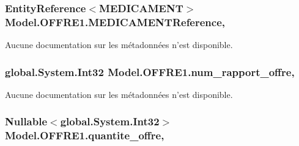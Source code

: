 \hypertarget{class_model_1_1_o_f_f_r_e1_a7725364d8165f3e4da799655ca3650a0}{
\subsubsection[{M\-E\-D\-I\-C\-A\-M\-E\-N\-T\-Reference}]{\setlength{\rightskip}{0pt plus 5cm}Entity\-Reference$<${\bf M\-E\-D\-I\-C\-A\-M\-E\-N\-T}$>$ Model.\-O\-F\-F\-R\-E1.\-M\-E\-D\-I\-C\-A\-M\-E\-N\-T\-Reference\hspace{0.3cm}{\ttfamily [get]}, {\ttfamily [set]}}}\label{class_model_1_1_o_f_f_r_e1_a7725364d8165f3e4da799655ca3650a0}


Aucune documentation sur les métadonnées n'est disponible. 

\hypertarget{class_model_1_1_o_f_f_r_e1_ad57c3bdb1734c2de219aaf5267da7a33}{
\subsubsection[{num\-\_\-rapport\-\_\-offre}]{\setlength{\rightskip}{0pt plus 5cm}global.\-System.\-Int32 Model.\-O\-F\-F\-R\-E1.\-num\-\_\-rapport\-\_\-offre\hspace{0.3cm}{\ttfamily [get]}, {\ttfamily [set]}}}\label{class_model_1_1_o_f_f_r_e1_ad57c3bdb1734c2de219aaf5267da7a33}


Aucune documentation sur les métadonnées n'est disponible. 

\hypertarget{class_model_1_1_o_f_f_r_e1_a87716ad990cd87804edfa1ae5eecd1f7}{
\subsubsection[{quantite\-\_\-offre}]{\setlength{\rightskip}{0pt plus 5cm}Nullable$<$global.\-System.\-Int32$>$ Model.\-O\-F\-F\-R\-E1.\-quantite\-\_\-offre\hspace{0.3cm}{\ttfamily [get]}, {\ttfamily [set]}}}\label{class_model_1_1_o_f_f_r_e1_a87716ad990cd87804edfa1ae5eecd1f7}


